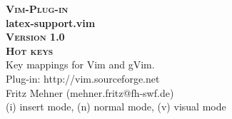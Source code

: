 \documentclass[oneside,10pt,landscape,DIV17]{scrartcl}
\newcommand{\Pluginversion}{1.0}
\begin{document}
\begin{multicols}{3}
\begin{center}
%
\textbf{\textsc{\small{Vim-Plug-in}}}\\
\textbf{\LARGE{latex-support.vim}}\\
\textbf{\textsc{\small{Version \Pluginversion}}}\\
\vspace{5mm}%
\textbf{\textsc{\Huge{Hot keys}}}\\ 
\vspace{5mm}%
Key mappings for Vim and gVim.\\
Plug-in: http://vim.sourceforge.net\\
Fritz Mehner (mehner.fritz@fh-swf.de)\\
\vspace{1.0mm}
{\normalsize (i)} insert mode, {\normalsize (n)} normal mode, {\normalsize (v)} visual mode\\
\vspace{4.0mm}


\end{center}
\end{multicols}
\end{document}
